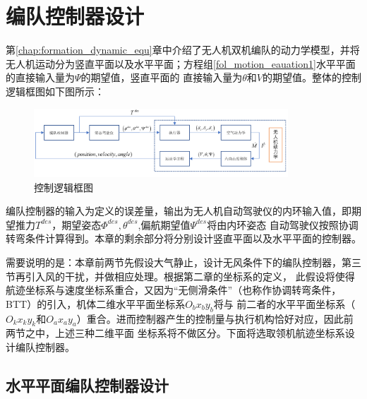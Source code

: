 \chapter{编队控制器设计}
\label{chap:controller_design}
第\ref{chap:formation_dynamic_equ}章中介绍了无人机双机编队的动力学模型，并将无人机运动分为竖直平面以及水平平面；方程组\ref{fol_motion_eauation1}水平平面的直接输入量为$\Psi$的期望值，竖直平面的
直接输入量为$\theta$和$V$的期望值。整体的控制逻辑框图如下图所示：
\begin{figure}[H]
    \centering
    \includegraphics[width=0.85\textwidth]{figures/c3/c3-overview_controller.png}
    \caption{控制逻辑框图}\label{fig:c3-overview_controller}
\end{figure}
编队控制器的输入为定义的误差量，输出为无人机自动驾驶仪的内环输入值，即期望推力$T^{des}$，期望姿态$\Phi^{des},\theta^{des}$,偏航期望值$\Psi^{des}$将由内环姿态
自动驾驶仪按照协调转弯条件计算得到。本章的剩余部分将分别设计竖直平面以及水平平面的控制器。

需要说明的是：本章前两节先假设大气静止，设计无风条件下的编队控制器，第三节再引入风的干扰，并做相应处理。根据第二章的坐标系的定义，
此假设将使得航迹坐标系与速度坐标系重合，又因为“无侧滑条件”（也称作协调转弯条件，BTT）的引入，机体二维水平平面坐标系$O_bx_by_b$将与
前二者的水平平面坐标系（$O_kx_ky_k$和$O_ax_ay_a$）重合。进而控制器产生的控制量与执行机构恰好对应，因此前两节之中，上述三种二维平面
坐标系将不做区分。下面将选取领机航迹坐标系设计编队控制器。
\section{水平平面编队控制器设计}
